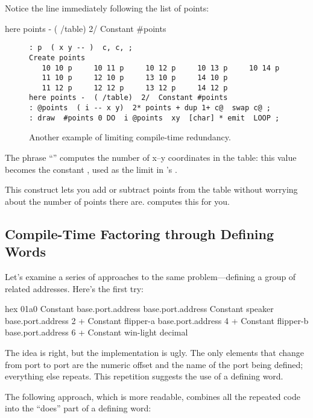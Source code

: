Notice the line immediately following the list of points:

\begin{Code}
here points -  ( /table)  2/  Constant #points
\end{Code}
\begin{figure*}[bbbb]
\caption{Another example of limiting compile-time redundancy.}
\begin{center}
\begin{BVerbatim}
: p  ( x y -- )  c, c, ;
Create points
   10 10 p     10 11 p     10 12 p     10 13 p     10 14 p
   11 10 p     12 10 p     13 10 p     14 10 p
   11 12 p     12 12 p     13 12 p     14 12 p
here points -  ( /table)  2/  Constant #points
: @points  ( i -- x y)  2* points + dup 1+ c@  swap c@ ;
: draw  #points 0 DO  i @points  xy  [char] * emit  LOOP ;
\end{BVerbatim}
\end{center}
\end{figure*}
The phrase ``'' computes the number of x--y
coordinates in the table: this value becomes the constant
, used as the limit in 's
.

This construct lets you add or subtract points from the table without
worrying about the number of points there are. \Forth{} computes this
for you.

\subsection{Compile-Time Factoring through Defining Words}%
Let's examine a series of approaches to the same problem---defining a
group of related addresses. Here's the first try:

\begin{Code}
hex 01a0 Constant base.port.address
base.port.address Constant speaker
base.port.address 2 + Constant flipper-a
base.port.address 4 + Constant flipper-b
base.port.address 6 + Constant win-light
decimal
\end{Code}
The idea is right, but the implementation is ugly. The only elements
that change from port to port are the numeric offset and the name of
the port being defined; everything else repeats. This repetition
suggests the use of a defining word.

The following approach, which is more readable, combines all the
repeated code into the ``does'' part  of a defining word:

